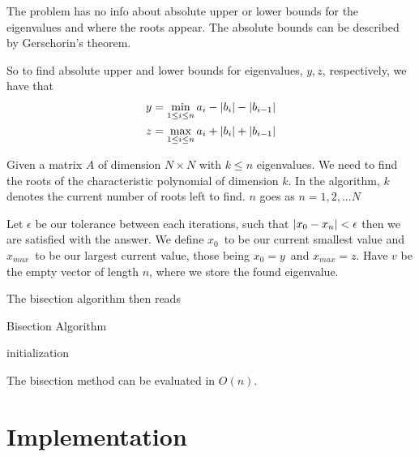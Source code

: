 \documentclass[%
reprint,
nofootinbib,
amsmath,amssymb,
aps,
]{revtex4-1}
\begin{document}
The problem has no info about absolute upper or lower bounds for the eigenvalues and where the roots appear. The absolute bounds can be described by Gerschorin's theorem\cite{AlbrechtCE09}. 

So to find absolute upper and lower bounds for eigenvalues, $y,z$, respectively, we have that 
\begin{equation}
	\begin{split}
		y &= \min_{1\leq i\leq n} a_i - \abs{b_i} - \abs{b_{i-1}}\\
		z &= \max_{1\leq i\leq n} a_i + \abs{b_i} + \abs{b_{i-1}}
	\end{split}
\end{equation}

Given a matrix $A$ of dimension $N\times N$ with $k\leq n$ eigenvalues. We need to find the roots of the characteristic polynomial of dimension $k$. In the algorithm, $k$ denotes the current number of roots left to find. $n$ goes as $n = 1,2,... N$

Let $\epsilon$ be our tolerance between each iterations, such that $\abs{x_{0} - x_{n}} < \epsilon$ then we are satisfied with the answer. We define $x_0$ to be our current smallest value and $x_{max}$ to be our largest current value, those being $x_0 = y$ and $x_{max} = z$. Have $v$ be the empty vector of length $n$, where we store the found eigenvalue. 

The bisection algorithm then reads 
\begin{algorithm}[H]\label{algo:bi}
	\SetAlgoLined
	\caption{Bisection Algorithm}
	initialization\;
\end{algorithm}

The bisection method can be evaluated in $O(n)$\cite{barth1967calculation}. 
\section{Implementation} %
\end{document}
